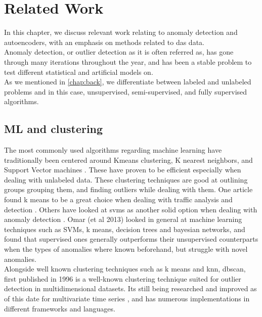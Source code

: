 \chapter{Related Work}
\label{chap:relwork}

In this chapter, we discuss relevant work relating to anomaly detection and autoencoders, with an emphasis on methods related to \acrshort{das} data. \\


Anomaly detection, or outlier detection as it is often referred as, has gone through many iterations throughout the year, and has been a stable problem to test different statistical and artificial models on. \\ 

As we mentioned in \ref{chap:back}, we differentiate between labeled and unlabeled problems and in this case, unsupervised, semi-supervised, and fully supervised algorithms.

\section{ML and clustering}
The most commonly used algorithms regarding machine learning have traditionally been centered around Kmeans clustering, K nearest neighbors, and  Support Vector machines \cite{10.14778/3538598.3538602, 10.1145/3444690}. These have proven to be efficient especially when dealing with unlabeled data. These clustering techniques are good at outlining groups grouping them, and finding outliers while dealing with them. One article found k means to be a great choice when dealing with traffic analysis and detection \cite{7507933}. Others have looked at svms as another solid option when dealing with anomaly detection \cite{10.1007/978-3-540-28647-9_97}. Omar (et al 2013) \cite{omar2013machine} looked in general at machine learning techniques such as SVMs, k means, decision trees and bayesian networks, and found that supervised ones generally outperforms their unsupervised counterparts when the types of anomalies where known beforehand, but struggle with novel anomalies. \\ 

Alongside well known clustering techniques such as k means and knn, \acrfull{dbscan}, first published in 1996 \cite{10.5555/3001460.3001507} is a well-known clustering technique suited for outlier detection in multidimensional datasets. Its still being researched and improved as of this date for multivariate time series \cite{waltz2024time}, and has numerous implementations in different frameworks and languages. 

